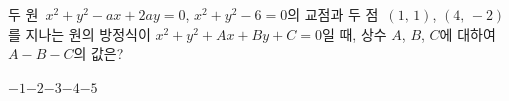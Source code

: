 두 원~$x^2+y^2-ax+2ay=0$, $x^2+y^2-6=0$의 교점과 두 점~$(1,\,1)$, $(4,\,-2)$를 지나는 원의 방정식이 $x^2+y^2+Ax+By+C=0$일 때, 상수 $A$, $B$, $C$에 대하여 $A-B-C$의 값은? 
\begin{choices32}{$-1$}{$-2$}{$-3$}{$-4$}{$-5$}\end{choices32}
